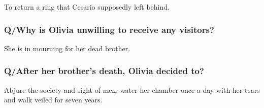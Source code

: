 \documentclass[12pt, a4paper]{article}
\begin{document}
To return a ring that Cesario supposedly left behind.
 
\subsubsection*{Q/Why is Olivia unwilling to receive any visitors?}

She is in mourning for her dead brother.

\subsubsection*{Q/After her brother's death, Olivia decided to?}

Abjure the society and sight of men, water her chamber once a day with her tears and walk veiled for seven years.

\section*{}\bigbreak
\end{document}
